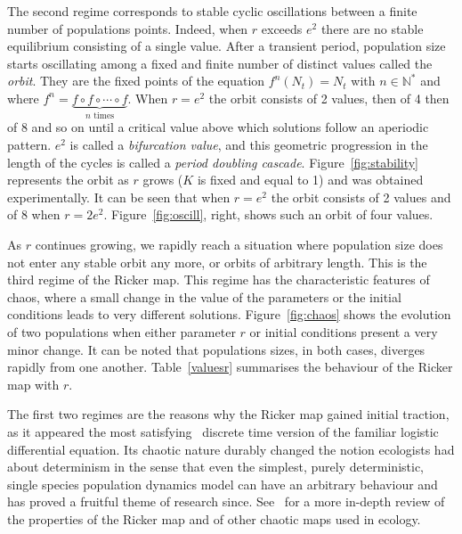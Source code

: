 \documentclass[12pt]{article}
\begin{document}
	The second regime corresponds to stable cyclic oscillations between a finite number of populations points. Indeed, when $r$ exceeds $e^2$ there are no stable equilibrium consisting of a single value. After a transient period, population size starts oscillating among a fixed and finite number of distinct values called the \emph{orbit}. They are the fixed points of the equation $f^n(N_t) = N_t$ with $n \in \mathbb{N^*}$ and where $f^n = \underbrace{f\circ f\circ \cdots \circ f}_{n\text{\ times}}$. When $r=e^2$ the orbit consists of 2 values, then of 4 then of 8 and so on until a critical value above which solutions follow an aperiodic pattern. $e^2$ is called a \emph{bifurcation value}, and this geometric progression in the length of the cycles is called a \emph{period doubling cascade}. Figure~\ref{fig:stability} represents the orbit as $r$ grows ($K$ is fixed and equal to 1) and was obtained experimentally. It can be seen that when $r=e^2$ the orbit consists of 2 values and of 8 when $r=2e^2$. Figure~\ref{fig:oscill}, right, shows such an orbit of four values.
	
	As $r$ continues growing, we rapidly reach a situation where population size does not enter any stable orbit any more, or orbits of arbitrary length. This is the third regime of the Ricker map. This regime has the characteristic features of chaos, where a small change in the value of the parameters or the initial conditions leads to very different solutions. Figure~\ref{fig:chaos} shows the evolution of two populations when either parameter $r$ or initial conditions present a very minor change. It can be noted that populations sizes, in both cases, diverges rapidly from one another. Table~\ref{valuesr} summarises the behaviour of the Ricker map with $r$.
	
	The first two regimes are the reasons why the Ricker map gained initial traction, as it appeared the most satisfying~\cite{cook1965oscillation} discrete time version of the familiar logistic differential equation. Its chaotic nature durably changed the notion ecologists had about determinism in the sense that even the simplest, purely deterministic, single species population dynamics model can have an arbitrary behaviour and has proved a fruitful theme of research since. See~\cite{may1975biological} for a more in-depth review of the properties of the Ricker map and of other chaotic maps used in ecology. 
	
\end{document}
